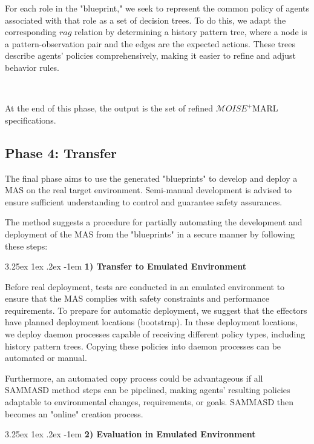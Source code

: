 \documentclass[conference]{IEEEtran}
\makeatletter
\renewcommand\paragraph{\@startsection{paragraph}{5}{\z@}%
  {3.25ex \@plus1ex \@minus.2ex}%
  {-1em}%
  {\normalfont\normalsize\bfseries}}
\makeatother
\begin{document}
For each role in the "blueprint," we seek to represent the common policy of agents associated with that role as a set of decision trees. To do this, we adapt the corresponding $rag$ relation by determining a history pattern tree, where a node is a pattern-observation pair and the edges are the expected actions. These trees describe agents' policies comprehensively, making it easier to refine and adjust behavior rules.

\

At the end of this phase, the output is the set of refined $\mathcal{M}OISE^+$MARL specifications.

\subsection{Phase 4: Transfer}

The final phase aims to use the generated "blueprints" to develop and deploy a MAS on the real target environment. Semi-manual development is advised to ensure sufficient understanding to control and guarantee safety assurances.

The method suggests a procedure for partially automating the development and deployment of the MAS from the "blueprints" in a secure manner by following these steps:

\paragraph{\textbf{1) Transfer to Emulated Environment}}

Before real deployment, tests are conducted in an emulated environment to ensure that the MAS complies with safety constraints and performance requirements. To prepare for automatic deployment, we suggest that the effectors have planned deployment locations (bootstrap). In these deployment locations, we deploy daemon processes capable of receiving different policy types, including history pattern trees. Copying these policies into daemon processes can be automated or manual.

Furthermore, an automated copy process could be advantageous if all SAMMASD method steps can be pipelined, making agents' resulting policies adaptable to environmental changes, requirements, or goals. SAMMASD then becomes an "online" creation process.

\paragraph{\textbf{2) Evaluation in Emulated Environment}}
\end{document}
